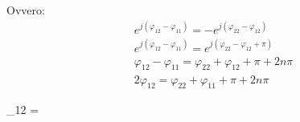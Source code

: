 Ovvero:
\begin{equation*}
    \begin{aligned}
    &e^{j(\varphi_{12} - \varphi_{11})} = -e^{j(\varphi_{22}-\varphi_{12})}\\
    &e^{j(\varphi_{12} - \varphi_{11})} = e^{j(\varphi_{22}-\varphi_{12} + \pi)}\\
    &\varphi_{12} - \varphi_{11} = \varphi_{22}+\varphi_{12} + \pi + 2n\pi\\
    &2\varphi_{12} = \varphi_{22}+\varphi_{11}+ \pi + 2n\pi
    \end{aligned}
\end{equation*}
\begin{squared}
    \varphi_{12} =   \pm {}
\end{squared}